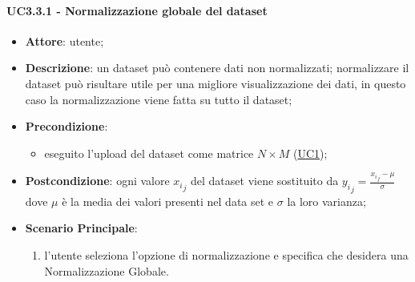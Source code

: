     \paragraph{UC3.3.1 - Normalizzazione globale del dataset}
    \label{uc3.3.1}
    \begin{itemize}
    \item \textbf{Attore}: utente;
    \item \textbf{Descrizione}: un dataset può contenere dati non normalizzati; normalizzare il dataset può risultare utile per una migliore visualizzazione dei dati, in questo caso la normalizzazione viene fatta su tutto il dataset;
    \item \textbf{Precondizione}: 
    \begin{itemize}
        \item eseguito l'upload del dataset come matrice $N\times M$ (\hyperref[uc1]{UC1});
    \end{itemize}  
    \item \textbf{Postcondizione}:  ogni valore ${x_i}_j$ del dataset viene sostituito da $ {y_i}_j = \frac{{x_i}_j - \mu}{\sigma}$ dove $\mu$ è la media dei valori presenti nel data set e $\sigma$ la loro varianza;
    \item \textbf{Scenario Principale}: 
    \begin{enumerate}
        \item l'utente seleziona l'opzione di normalizzazione e specifica che desidera una Normalizzazione Globale.
    \end{enumerate}  
    \end{itemize}
    

